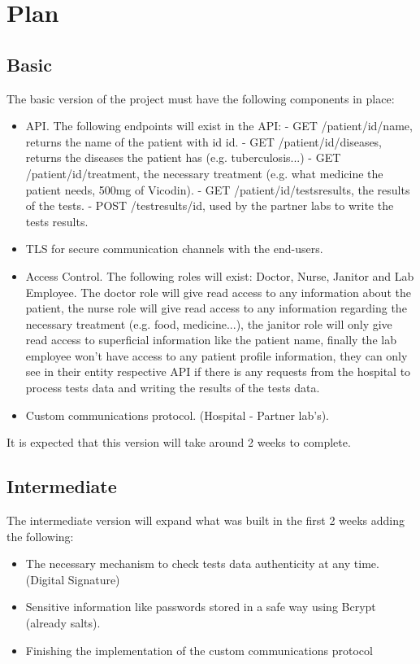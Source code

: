 \section{Plan}

\subsection{Basic}
The basic version of the project must have the following components in place:
\begin{itemize}
	\item API.
		\subitem The following endpoints will exist in the API:
		\subitem - GET /patient/{id}/name, returns the name of the patient with id {id}.
		\subitem - GET /patient/{id}/diseases, returns the diseases the patient has (e.g. tuberculosis...)
		\subitem - GET /patient/{id}/treatment, the necessary treatment (e.g. what medicine the patient needs, 500mg of Vicodin).
		\subitem - GET /patient/{id}/testsresults, the results of the tests.
		\subitem - POST /testresults/{id}, used by the partner labs to write the tests results.
	\item TLS for secure communication channels with the end-users.
	\item Access Control.
		\subitem The following roles will exist: Doctor, Nurse, Janitor and Lab Employee. The doctor role will give read access to any information about the patient, the nurse role will give read access to any information regarding the necessary treatment (e.g. food, medicine...), the janitor role will only give  read access to superficial information like the patient name, finally the lab employee won't have access to any patient profile information, they can only see in their entity respective API if there is any requests from the hospital to process tests data and writing the results of the tests data.
	\item Custom communications protocol. (Hospital - Partner lab's).
\end{itemize}

It is expected that this version will take around 2 weeks to complete. 


\subsection{Intermediate}
The intermediate version will expand what was built in the first 2 weeks adding the following:
\begin{itemize}
	\item The necessary mechanism to check tests data authenticity at any time. (Digital Signature)
	\item Sensitive information like passwords stored in a safe way using Bcrypt (already salts).
	\item Finishing the implementation of the custom communications protocol
\end{itemize}

